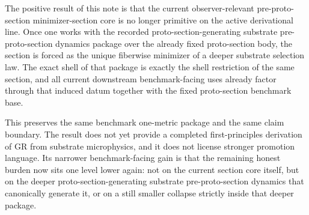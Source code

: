 \documentclass[11pt]{article}
\begin{document}
The positive result of this note is that the current observer-relevant pre-proto-section minimizer-section core is no longer primitive on the active derivational line. Once one works with the recorded proto-section-generating substrate pre-proto-section dynamics package over the already fixed proto-section body, the section is forced as the unique fiberwise minimizer of a deeper substrate selection law. The exact shell of that package is exactly the shell restriction of the same section, and all current downstream benchmark-facing uses already factor through that induced datum together with the fixed proto-section benchmark base.

This preserves the same benchmark one-metric package and the same claim boundary. The result does not yet provide a completed first-principles derivation of GR from substrate microphysics, and it does not license stronger promotion language. Its narrower benchmark-facing gain is that the remaining honest burden now sits one level lower again: not on the current section core itself, but on the deeper proto-section-generating substrate pre-proto-section dynamics that canonically generate it, or on a still smaller collapse strictly inside that deeper package.
\end{document}

